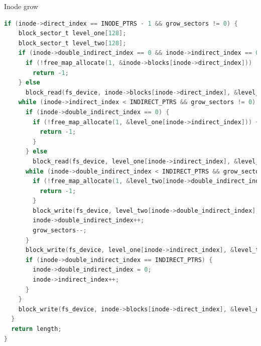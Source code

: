 \documentclass[10pt]{beamer}
\begin{document}
\begin{frame}[fragile]{Inode grow}
\begin{lstlisting}[language=C]
if (inode->direct_index == INODE_PTRS - 1 && grow_sectors != 0) {
    block_sector_t level_one[128];
    block_sector_t level_two[128];
    if (inode->double_indirect_index == 0 && inode->indirect_index == 0) {
      if (!free_map_allocate(1, &inode->blocks[inode->direct_index]))
        return -1;
    } else 
      block_read(fs_device, inode->blocks[inode->direct_index], &level_one);
    while (inode->indirect_index < INDIRECT_PTRS && grow_sectors != 0) {
      if (inode->double_indirect_index == 0) {
        if (!free_map_allocate(1, &level_one[inode->indirect_index])) {
          return -1;
        }
      } else
        block_read(fs_device, level_one[inode->indirect_index], &level_two);
      while (inode->double_indirect_index < INDIRECT_PTRS && grow_sectors != 0) {
        if (!free_map_allocate(1, &level_two[inode->double_indirect_index])) {
          return -1;
        }
        block_write(fs_device, level_two[inode->double_indirect_index], zeros);
        inode->double_indirect_index++;
        grow_sectors--;
      }
      block_write(fs_device, level_one[inode->indirect_index], &level_two);
      if (inode->double_indirect_index == INDIRECT_PTRS) {
        inode->double_indirect_index = 0;
        inode->indirect_index++;
      }
    }
    block_write(fs_device, inode->blocks[inode->direct_index], &level_one);
  }
  return length;
}
\end{lstlisting}
\end{frame}
\end{document}
